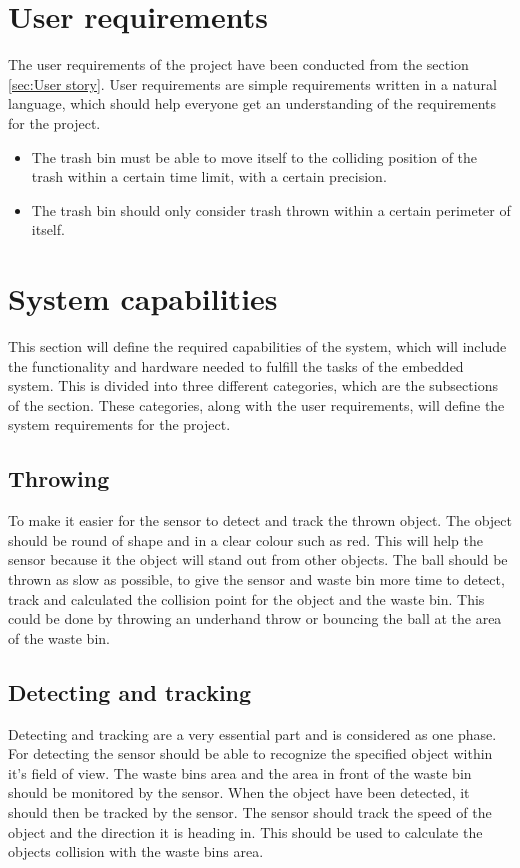 \section{User requirements}
\label{sec:User requirements}
The user requirements of the project have been conducted from the section \ref{sec:User story}. User requirements are simple requirements written in a natural language, which should help everyone get an understanding of the requirements for the project.

\begin{itemize}
\item The trash bin must be able to move itself to the colliding position of the trash within a certain time limit, with a certain precision.
\item The trash bin should only consider trash thrown within a certain perimeter of itself.
\end{itemize}

\section{System capabilities}
\label{sec:System capabilities}
This section will define the required capabilities of the system, which will include the functionality and hardware needed to fulfill the tasks of the embedded system. This is divided into three different categories, which are the subsections of the section. These categories, along with the user requirements, will define the system requirements for the project.

\subsection{Throwing}
\label{sec:ThrowingAnalysis}
To make it easier for the sensor to detect and track the thrown object. The object should be round of shape and in a clear colour such as red. This will help the sensor because it the object will stand out from other objects. \newline
The ball should be thrown as slow as possible, to give the sensor and waste bin more time to detect, track and calculated the collision point for the object and the waste bin. This could be done by throwing an underhand throw or bouncing the ball at the area of the waste bin.

\subsection{Detecting and tracking}
\label{sec:Detecting and trackingAnalysis}
Detecting and tracking are a very essential part and is considered as one phase. For detecting the sensor should be able to recognize the specified object within it's field of view. The waste bins area and the area in front of the waste bin should be monitored by the sensor. \newline When the object have been detected, it should then be tracked by the sensor. The sensor should track the speed of the object and the direction it is heading in. This should be used to calculate the objects collision with the waste bins area.


